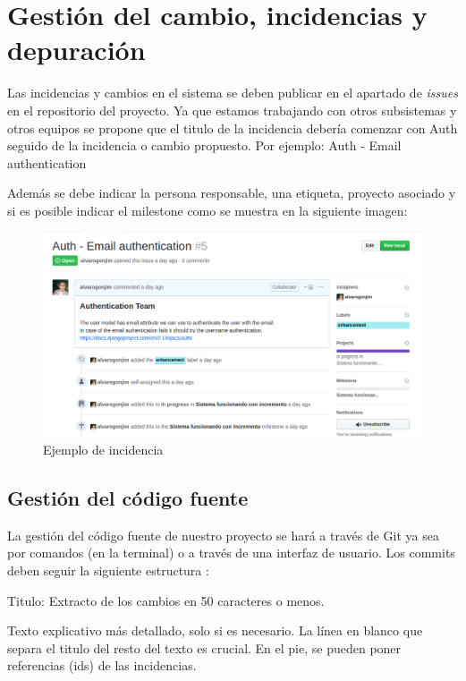 \documentclass[12pt]{article}
\begin{document}
\section{Gestión del cambio, incidencias y depuración}

Las incidencias y cambios en el sistema se deben publicar en el apartado de  \emph{issues} en el repositorio del proyecto. Ya que estamos trabajando con otros subsistemas y otros equipos se propone que el titulo de la incidencia debería comenzar con Auth seguido de la incidencia o cambio propuesto. Por ejemplo: Auth - Email authentication \cite{auth-issue}

Además se debe indicar la persona responsable, una etiqueta, proyecto asociado y si es posible indicar el milestone como se muestra en la siguiente imagen:

\begin{figure}[h]
\centering
\includegraphics[width=1\textwidth]{issue-example.png}
\caption{Ejemplo de incidencia}
\end{figure}

\newpage
\subsection{Gestión del código fuente}
La gestión del código fuente de nuestro proyecto se hará a través de Git ya sea por comandos (en la terminal) o a través de una interfaz de usuario. 
Los commits deben seguir la siguiente estructura \cite{commit-structure}:

Titulo: Extracto de los cambios en 50 caracteres o menos.

Texto explicativo más detallado, solo si es necesario. La línea en blanco que separa el titulo del resto del texto es crucial.
En el pie, se pueden poner referencias (ids) de las incidencias.
\end{document}
